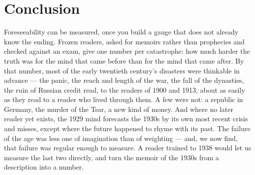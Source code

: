 \documentclass[11pt]{article}
\begin{document}
\section{Conclusion}\label{sec:conclusion}

Foreseeability can be measured, once you build a gauge that does not already know the ending. Frozen
readers, asked for memoirs rather than prophecies and checked against an exam, give one number per
catastrophe: how much harder the truth was for the mind that came before than for the mind that came after.
By that number, most of the early twentieth century's disasters were thinkable in advance --- the panic, the
reach and length of the war, the fall of the dynasties, the ruin of Russian credit read, to the readers of
1900 and 1913, about as easily as they read to a reader who lived through them. A few were not: a republic
in Germany, the murder of the Tsar, a new kind of money. And where no later reader yet exists, the 1929 mind
forecasts the 1930s by its own most recent crisis and misses, except where the future happened to rhyme with
its past. The failure of the age was less one of imagination than of weighting --- and, we now find, that
failure was regular enough to measure. A reader trained to 1938 would let us measure the last two directly,
and turn the memoir of the 1930s from a description into a number.
\end{document}
